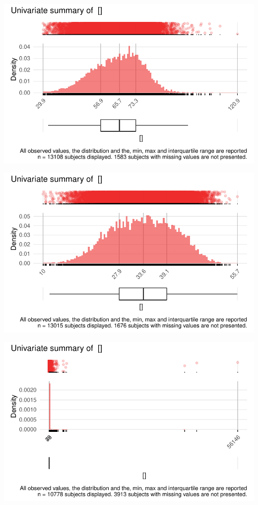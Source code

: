 \documentclass[
  letterpaper,
  DIV=11,
  numbers=noendperiod]{scrreport}
\begin{document}
\includegraphics{./Bact_univar_files/figure-pdf/uni04-20.pdf}

\includegraphics{./Bact_univar_files/figure-pdf/uni04-21.pdf}

\includegraphics{./Bact_univar_files/figure-pdf/uni04-22.pdf}
\end{document}
